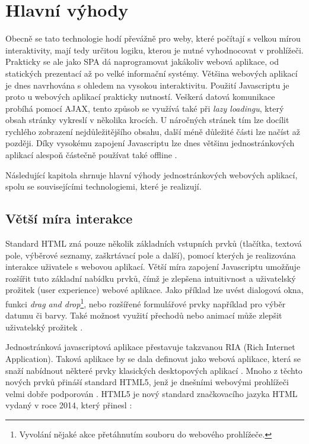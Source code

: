 \section{Hlavní výhody}
Obecně se tato technologie hodí převážně pro weby, které počítají s velkou mírou interaktivity, mají tedy určitou logiku, kterou je nutné vyhodnocovat v prohlížeči. Prakticky se ale jako SPA dá naprogramovat jakákoliv webová aplikace, od statických prezentací až po velké informační systémy. Většina webových aplikací je dnes navrhována s ohledem na vysokou interaktivitu. Použití Javascriptu je proto u webových aplikací prakticky nutností. Veškerá datová komunikace probíhá pomocí AJAX, tento způsob se využívá také při \textit{lazy loadingu}, který obsah stránky vykreslí v několika krocích. U náročných stránek tím lze docílit rychlého zobrazení nejdůležitějšího obsahu, další méně důležité části lze načíst až později. Díky vysokému zapojení Javascriptu lze dnes většinu jednostránkových aplikací alespoň částečně používat také offline \cite{spa_book} \cite{spa_horyna}.

Následující kapitola shrnuje hlavní výhody jednostránkových webových aplikací, spolu se souvisejícími technologiemi, které je realizují.

\subsection{Větší míra interakce}
Standard HTML zná pouze několik základních vstupních prvků (tlačítka, textová pole, výběrové seznamy, zaškrtávací pole a další), pomocí kterých je realizována interakce uživatele s webovou aplikací. Větší míra zapojení Javascriptu umožňuje rozšířit tuto základní nabídku prvků, čímž je zlepšena intuitivnost a uživatelský prožitek (user experience) webové aplikace. Jako příklad lze uvést dialogová okna, funkci \textit{drag and drop}\footnote{Vyvolání nějaké akce přetáhnutím souboru do webového prohlížeče.}, nebo rozšířené formulářové prvky například pro výběr datumu či barvy. Také možnost využití přechodů nebo animací může zlepšit uživatelský prožitek \cite{spa_book} \cite{spa_horyna}.

Jednostránková javascriptová aplikace přestavuje takzvanou RIA (Rich Internet Application). Taková aplikace by se dala definovat jako webová aplikace, která se snaží nabídnout některé prvky klasických desktopových aplikací \cite{ria}. Mnoho z těchto nových prvků přináší standard HTML5, jenž je dnešními webovými prohlížeči velmi dobře podporován\cite{spa_book} \cite{spa_web}. HTML5 je nový standard značkovacího jazyka HTML vydaný v roce 2014, který přinesl \cite{janovsky_html5} \cite{html5_css3_book}:

